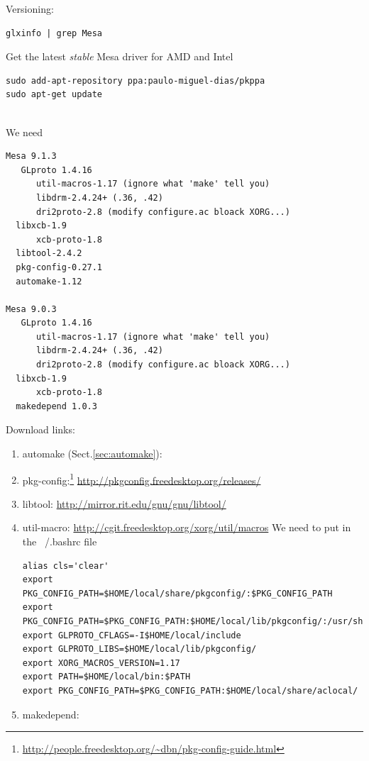 Versioning:
\begin{verbatim}
glxinfo | grep Mesa
\end{verbatim}

Get the latest {\it stable} Mesa driver for AMD and Intel
\begin{verbatim}
sudo add-apt-repository ppa:paulo-miguel-dias/pkppa
sudo apt-get update


\end{verbatim}

We need
\begin{verbatim}
Mesa 9.1.3
   GLproto 1.4.16
      util-macros-1.17 (ignore what 'make' tell you)
      libdrm-2.4.24+ (.36, .42)
      dri2proto-2.8 (modify configure.ac bloack XORG...)
  libxcb-1.9
      xcb-proto-1.8
  libtool-2.4.2
  pkg-config-0.27.1
  automake-1.12

Mesa 9.0.3
   GLproto 1.4.16
      util-macros-1.17 (ignore what 'make' tell you)
      libdrm-2.4.24+ (.36, .42)
      dri2proto-2.8 (modify configure.ac bloack XORG...)
  libxcb-1.9
      xcb-proto-1.8
  makedepend 1.0.3 
\end{verbatim}

Download links:
\begin{enumerate}
  \item automake (Sect.\ref{sec:automake}):
  

  \item
  pkg-config:\footnote{\url{http://people.freedesktop.org/~dbn/pkg-config-guide.html}}
  \url{http://pkgconfig.freedesktop.org/releases/}
  
  \item libtool: \url{http://mirror.rit.edu/gnu/gnu/libtool/}
  
  \item util-macro: \url{http://cgit.freedesktop.org/xorg/util/macros}
  We need to put in the ~/.bashrc file
\begin{verbatim}
alias cls='clear'
export PKG_CONFIG_PATH=$HOME/local/share/pkgconfig/:$PKG_CONFIG_PATH
export PKG_CONFIG_PATH=$PKG_CONFIG_PATH:$HOME/local/lib/pkgconfig/:/usr/share/pkgconfig/
export GLPROTO_CFLAGS=-I$HOME/local/include
export GLPROTO_LIBS=$HOME/local/lib/pkgconfig/
export XORG_MACROS_VERSION=1.17
export PATH=$HOME/local/bin:$PATH
export PKG_CONFIG_PATH=$PKG_CONFIG_PATH:$HOME/local/share/aclocal/
\end{verbatim}  

\item makedepend: 

  \end{enumerate}

